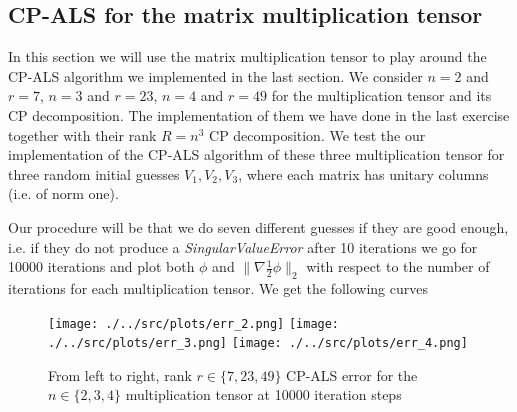 \documentclass[a4paper]{article}
\begin{document}
\subsection{CP-ALS for the matrix multiplication tensor}
In this section we will use the matrix multiplication tensor to play around
the CP-ALS algorithm we implemented in the last section. We consider $n = 2$
and $r = 7$, $n = 3$ and $r = 23$, $n = 4$ and $r = 49$ for the
multiplication tensor and its CP decomposition. The implementation of them we
have done in the last exercise together with their rank $R = n^3$ CP
decomposition. We test the our implementation of the CP-ALS algorithm of
these three multiplication tensor for three random initial guesses $V_1, V_2,
V_3$, where each matrix has unitary columns (i.e. of norm one).

Our procedure will be that we do seven different guesses if they are good
enough, i.e. if they do not produce a \textit{SingularValueError} after 10
iterations we go for 10000 iterations and plot both $\phi$ and $\|\nabla
\frac{1}{2} \phi\|_2$ with respect to the number of iterations for each
multiplication tensor. We get the following curves
\begin{figure}[H]
    \centering \texttt{[image: ./../src/plots/err\_2.png]}
    \texttt{[image: ./../src/plots/err\_3.png]}
    \texttt{[image: ./../src/plots/err\_4.png]}
    \caption{From left to right, rank $r\in\{7, 23, 49\}$ CP-ALS error for the
    $n\in \{2, 3, 4\}$ multiplication tensor at 10000 iteration steps}
\end{figure}



\printbibliography
\end{document}
